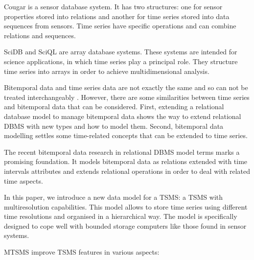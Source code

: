 Cougar \cite{bonnet01} is a sensor database system. It has two
structures: one for sensor properties stored into relations and
another for time series stored into data sequences from sensors.  Time
series have specific operations and can combine relations and
sequences. %

SciDB \cite{stonebraker09:scidb} and SciQL \cite{zhang11} are array
database systems. These systems are intended for science applications,
in which time series play a principal role. They structure time series
into arrays in order to achieve multidimensional analysis. %

Bitemporal data and time series data are not exactly the same and so
can not be treated interchangeably \cite{schmidt95}. However, there
are some similarities between time series and bitemporal data that can
be considered. First, extending a relational database model to manage
bitemporal data shows the way to extend relational DBMS with new types
and how to model them. Second, bitemporal data modelling settles some
time-related concepts that can be extended to time series.

The recent bitemporal data research in relational DBMS model terms
\cite{date02:_tempor_data_relat_model} marks a promising
foundation. It models bitemporal data as relations extended with time
intervals attributes and extends relational operations in order to
deal with related time aspects.


In this paper, we introduce a new data model for a TSMS: a TSMS with
multiresolution capabilities. This model allows to store time series
using different time resolutions and organised in a
hierarchical way. The model is specifically designed to cope
well with bounded storage computers like those found in sensor
systems.

MTSMS improve TSMS features in various aspects:

